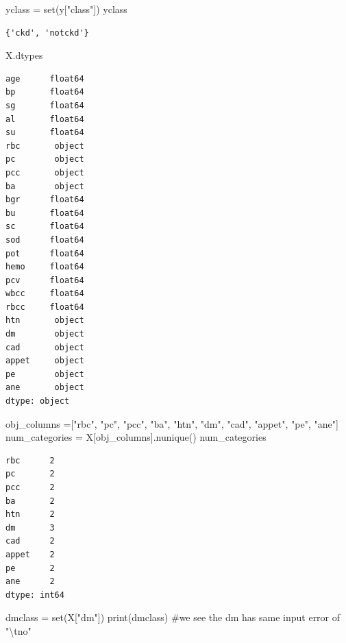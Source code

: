 \documentclass[
  11pt,
  letterpaper,
  DIV=11,
  numbers=noendperiod]{scrartcl}
\newenvironment{Shaded}{\begin{snugshade}}{\end{snugshade}}
\newcommand{\BuiltInTok}[1]{\textcolor[rgb]{0.00,0.23,0.31}{#1}}
\newcommand{\CommentTok}[1]{\textcolor[rgb]{0.37,0.37,0.37}{#1}}
\newcommand{\NormalTok}[1]{\textcolor[rgb]{0.00,0.23,0.31}{#1}}
\newcommand{\OperatorTok}[1]{\textcolor[rgb]{0.37,0.37,0.37}{#1}}
\newcommand{\StringTok}[1]{\textcolor[rgb]{0.13,0.47,0.30}{#1}}
\begin{document}
\begin{Shaded}
\begin{Highlighting}[]
\NormalTok{yclass }\OperatorTok{=} \BuiltInTok{set}\NormalTok{(y[}\StringTok{"class"}\NormalTok{])}
\NormalTok{yclass}
\end{Highlighting}
\end{Shaded}

\begin{verbatim}
{'ckd', 'notckd'}
\end{verbatim}

\begin{Shaded}
\begin{Highlighting}[]
\NormalTok{X.dtypes}
\end{Highlighting}
\end{Shaded}

\begin{verbatim}
age      float64
bp       float64
sg       float64
al       float64
su       float64
rbc       object
pc        object
pcc       object
ba        object
bgr      float64
bu       float64
sc       float64
sod      float64
pot      float64
hemo     float64
pcv      float64
wbcc     float64
rbcc     float64
htn       object
dm        object
cad       object
appet     object
pe        object
ane       object
dtype: object
\end{verbatim}

\begin{Shaded}
\begin{Highlighting}[]
\NormalTok{obj\_columns }\OperatorTok{=}\NormalTok{[}\StringTok{"rbc"}\NormalTok{, }\StringTok{"pc"}\NormalTok{, }\StringTok{"pcc"}\NormalTok{, }\StringTok{"ba"}\NormalTok{, }\StringTok{"htn"}\NormalTok{, }\StringTok{"dm"}\NormalTok{, }\StringTok{"cad"}\NormalTok{, }\StringTok{"appet"}\NormalTok{, }\StringTok{"pe"}\NormalTok{, }\StringTok{"ane"}\NormalTok{]}
\NormalTok{num\_categories }\OperatorTok{=}\NormalTok{ X[obj\_columns].nunique()}
\NormalTok{num\_categories}
\end{Highlighting}
\end{Shaded}

\begin{verbatim}
rbc      2
pc       2
pcc      2
ba       2
htn      2
dm       3
cad      2
appet    2
pe       2
ane      2
dtype: int64
\end{verbatim}

\begin{Shaded}
\begin{Highlighting}[]
\NormalTok{dmclass }\OperatorTok{=} \BuiltInTok{set}\NormalTok{(X[}\StringTok{"dm"}\NormalTok{])}
\BuiltInTok{print}\NormalTok{(dmclass)}
\CommentTok{\#we see the dm has same input error of "\textquotesingle{}\textbackslash{}tno\textquotesingle{}"}
\end{Highlighting}
\end{Shaded}
\end{document}
